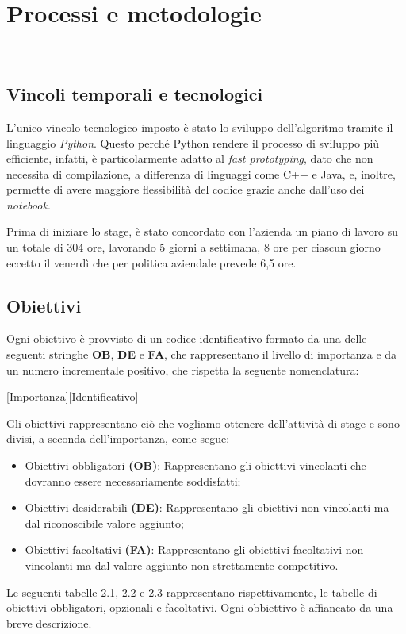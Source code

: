 \chapter{Processi e metodologie}
\label{cap:processi-metodologie}

\\


\section{Vincoli temporali e tecnologici}

L'unico vincolo tecnologico imposto è stato lo sviluppo dell'algoritmo tramite il linguaggio \emph{Python}\glsfirstoccur. Questo perché Python rendere il processo di sviluppo più efficiente, infatti, è particolarmente adatto al \emph{fast prototyping}\glsfirstoccur, dato che non necessita di compilazione, a differenza di linguaggi come C++ e Java, e, inoltre, permette di avere maggiore flessibilità del codice grazie anche dall'uso dei \emph{notebook}\glsfirstoccur.

Prima di iniziare lo stage, è stato concordato con l’azienda un piano di lavoro su un totale di 304 ore, lavorando 5 giorni a settimana, 8 ore per ciascun giorno eccetto il venerdì che per politica aziendale prevede 6,5 ore. 

\section{Obiettivi}

Ogni obiettivo è provvisto di un codice identificativo formato da una delle seguenti stringhe \textbf{OB}, \textbf{DE} e \textbf{FA}, che rappresentano il livello di importanza e da un numero incrementale positivo, che rispetta la seguente nomenclatura:
\begin{center}
    [Importanza][Identificativo]
\end{center}
Gli obiettivi rappresentano ciò che vogliamo ottenere dell'attività di stage e sono divisi, a seconda dell'importanza, come segue:
\begin{itemize}
    \item Obiettivi obbligatori \textbf{(OB)}: 
    Rappresentano gli obiettivi vincolanti che dovranno essere necessariamente soddisfatti;
    \item Obiettivi desiderabili \textbf{(DE)}:
    Rappresentano gli obiettivi non vincolanti ma dal riconoscibile valore aggiunto;
    \item Obiettivi facoltativi \textbf{(FA)}:
    Rappresentano gli obiettivi facoltativi non vincolanti ma dal valore aggiunto non strettamente competitivo.
\end{itemize}
Le seguenti tabelle 2.1, 2.2 e 2.3 rappresentano rispettivamente, le tabelle di obiettivi obbligatori, opzionali e facoltativi.
Ogni obbiettivo è affiancato da una breve descrizione.


